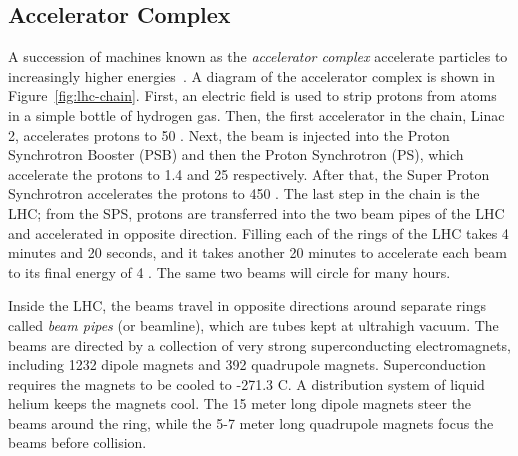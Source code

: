 \subsection{Accelerator Complex}
A succession of machines known as the \emph{accelerator complex} accelerate particles to increasingly higher energies~\cite{cern-jinst-lhc}. A diagram of the accelerator complex is shown in Figure~\ref{fig:lhc-chain}. First, an electric field is used to strip protons from atoms in a simple bottle of hydrogen gas. Then, the first accelerator in the chain, Linac 2, accelerates protons to 50 \mev. Next, the beam is injected into the Proton Synchrotron Booster (PSB) and then the Proton Synchrotron (PS), which accelerate the protons to 1.4 \gev and 25 \gev respectively. After that, the Super Proton Synchrotron accelerates the protons to 450 \gev. The last step in the chain is the LHC; from the SPS, protons are transferred into the two beam pipes of the LHC and accelerated in opposite direction. Filling each of the rings of the LHC takes 4 minutes and 20 seconds, and it takes another 20 minutes to accelerate each beam to its final energy of 4 \tev. The same two beams will circle for many hours.

Inside the LHC, the beams travel in opposite directions around separate rings called \emph{beam pipes} (or beamline), which are tubes kept at ultrahigh vacuum. The beams are directed by a collection of very strong superconducting electromagnets, including 1232 dipole magnets and 392 quadrupole magnets. Superconduction requires the magnets to be cooled to -271.3 C. A distribution system of liquid helium keeps the magnets cool. The 15 meter long dipole magnets steer the beams around the ring, while the 5-7 meter long quadrupole magnets focus the beams before collision. 






